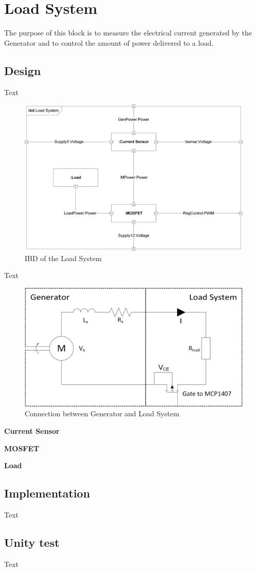 \section{Load System}
The purpose of this block is to measure the electrical current generated by the Generator and to control the amount of power delivered to a load.

\subsection{Design}
Text

\begin{figure}[H]
	\centering
	\includegraphics[width=0.7\linewidth]{Hardware/Pictures/IBD_LoadSystem}
	\caption{IBD of the Load System}
	\label{fig:IBD_Load_System}
\end{figure}

Text

\begin{figure}[H]
	\centering
	\includegraphics[width=0.7\linewidth]{Hardware/Pictures/LoadSystem}
	\caption{Connection between Generator and Load System}
	\label{fig:Load_System}
\end{figure}

\textbf{Current Sensor}

\textbf{MOSFET}

\textbf{Load}

\subsection{Implementation}
Text

\subsection{Unity test}
Text